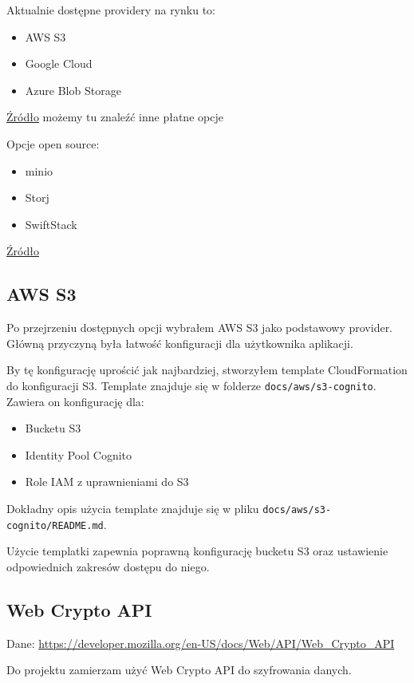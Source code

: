\documentclass[11pt, a4paper]{article}
\begin{document}
Aktualnie dostępne providery na rynku to:
\begin{itemize}
    \item AWS S3
    \item Google Cloud 
    \item Azure Blob Storage
\end{itemize}
\href{https://www.digitalocean.com/resources/articles/amazon-s3-alternatives}{Źródło} możemy tu znaleźć inne płatne opcje

Opcje open source:
\begin{itemize}
    \item minio
    \item Storj
    \item SwiftStack
\end{itemize}
\href{https://opensourcealternative.to/alternativesto/amazon-s3}{Źródło}

\subsection{AWS S3}

Po przejrzeniu dostępnych opcji wybrałem AWS S3 jako podstawowy provider.
Główną przyczyną była łatwość konfiguracji dla użytkownika aplikacji.

By tę konfigurację uprościć jak najbardziej, stworzyłem template CloudFormation do konfiguracji S3.
Template znajduje się w folderze \texttt{docs/aws/s3-cognito}.
Zawiera on konfigurację dla:
\begin{itemize}
    \item Bucketu S3 
    \item Identity Pool Cognito
    \item Role IAM z uprawnieniami do S3
\end{itemize}

Dokładny opis użycia template znajduje się w pliku \texttt{docs/aws/s3-cognito/README.md}.

Użycie templatki zapewnia poprawną konfigurację bucketu S3 oraz ustawienie odpowiednich zakresów dostępu do niego.

\newpage

\subsection{Web Crypto API}
Dane: \url{https://developer.mozilla.org/en-US/docs/Web/API/Web_Crypto_API}

Do projektu zamierzam użyć Web Crypto API do szyfrowania danych.
\end{document}

